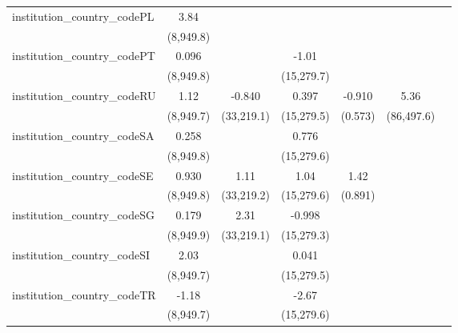 \begin{tabular}{lcccccc}
   institution\_country\_codePL          & 3.84          &               &               &               &              &   \\   
                                         & (8,949.8)     &               &               &               &              &   \\   
   institution\_country\_codePT          & 0.096         &               & -1.01         &               &              &   \\   
                                         & (8,949.8)     &               & (15,279.7)    &               &              &   \\   
   institution\_country\_codeRU          & 1.12          & -0.840        & 0.397         & -0.910        & 5.36         &   \\   
                                         & (8,949.7)     & (33,219.1)    & (15,279.5)    & (0.573)       & (86,497.6)   &   \\   
   institution\_country\_codeSA          & 0.258         &               & 0.776         &               &              &   \\   
                                         & (8,949.8)     &               & (15,279.6)    &               &              &   \\   
   institution\_country\_codeSE          & 0.930         & 1.11          & 1.04          & 1.42          &              &   \\   
                                         & (8,949.8)     & (33,219.2)    & (15,279.6)    & (0.891)       &              &   \\   
   institution\_country\_codeSG          & 0.179         & 2.31          & -0.998        &               &              &   \\   
                                         & (8,949.9)     & (33,219.1)    & (15,279.3)    &               &              &   \\   
   institution\_country\_codeSI          & 2.03          &               & 0.041         &               &              &   \\   
                                         & (8,949.7)     &               & (15,279.5)    &               &              &   \\   
   institution\_country\_codeTR          & -1.18         &               & -2.67         &               &              &   \\   
                                         & (8,949.7)     &               & (15,279.6)    &               &              &   \\   

\end{tabular}
